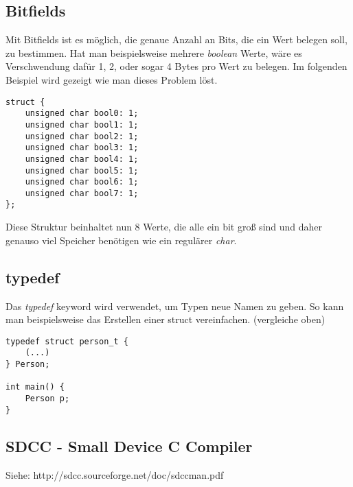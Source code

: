 \documentclass{article}
\begin{document}
\subsection{Bitfields}
Mit Bitfields ist es möglich, die genaue Anzahl an Bits, die ein Wert belegen soll, zu bestimmen. Hat man beispielsweise mehrere \textit{boolean} Werte, wäre es Verschwendung dafür 1, 2, oder sogar 4 Bytes pro Wert zu belegen. Im folgenden Beispiel wird gezeigt wie man dieses Problem löst.
\newpage
\begin{verbatim}
struct {
    unsigned char bool0: 1;
    unsigned char bool1: 1;
    unsigned char bool2: 1;
    unsigned char bool3: 1;
    unsigned char bool4: 1;
    unsigned char bool5: 1;
    unsigned char bool6: 1;
    unsigned char bool7: 1;
};
\end{verbatim}
Diese Struktur beinhaltet nun 8 Werte, die alle ein bit groß sind und daher genauso viel Speicher benötigen wie ein regulärer \textit{char}.

\subsection{typedef}
Das \textit{typedef} keyword wird verwendet, um Typen neue Namen zu geben. So kann man beispielsweise das Erstellen einer struct vereinfachen. (vergleiche oben)
\begin{verbatim}
typedef struct person_t {
    (...)
} Person;

int main() {
    Person p;
}
\end{verbatim}

\subsection{SDCC - Small Device C Compiler}

Siehe: http://sdcc.sourceforge.net/doc/sdccman.pdf
\end{document}
